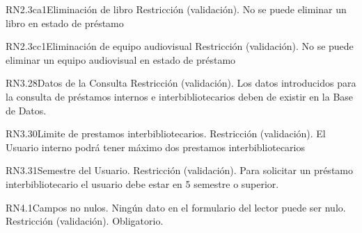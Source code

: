 \begin{BussinesRule}{RN2.3ca1}{Eliminación de libro} 
	\BRitem[Tipo:] Restricción (validación).
	\BRitem[Descripción:] No se puede eliminar un libro en estado de préstamo
\end{BussinesRule}

\begin{BussinesRule}{RN2.3cc1}{Eliminación de equipo audiovisual} 
	\BRitem[Tipo:] Restricción (validación).
	\BRitem[Descripción:] No se puede eliminar un equipo audiovisual en estado de préstamo
\end{BussinesRule}



\begin{BussinesRule}{RN3.28}{Datos de la Consulta} 
	\BRitem[Tipo:] Restricción (validación).
	\BRitem[Descripción:]Los datos introducidos para la consulta de préstamos internos e interbibliotecarios deben de existir en la Base de Datos.
\end{BussinesRule}

\begin{BussinesRule}{RN3.30}{Limite de prestamos interbibliotecarios.} 
	\BRitem[Tipo:] Restricción (validación).
	\BRitem[Descripción:]El Usuario interno podrá tener máximo dos prestamos interbibliotecarios
\end{BussinesRule}

\begin{BussinesRule}{RN3.31}{Semestre del Usuario.} 
	\BRitem[Tipo:] Restricción (validación).
	\BRitem[Descripción:]Para solicitar un préstamo interbibliotecario el usuario debe estar en 5 semestre o superior.
\end{BussinesRule}


\begin{BussinesRule}{RN4.1}{Campos no nulos.} 
	\BRitem[Descripción:] Ningún dato en el formulario del lector puede ser nulo.
	\BRitem[Tipo:] Restricción (validación).
	\BRitem[Nivel:] Obligatorio.
\end{BussinesRule}


